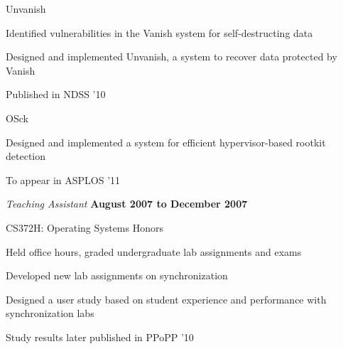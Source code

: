 \documentclass[10pt]{article}
\renewcommand{\section}[2]%
        {\pagebreak[2]\vspace{1.3\baselineskip}%
         \phantomsection\addcontentsline{toc}{section}{#1}%
         \hspace{0in}%
         \marginpar{
         \raggedright \scshape #1}#2}
\newenvironment{outerlist}[1][\enskip\textbullet]%
        {\begin{itemize}[#1]}{\end{itemize}%
         \vspace{-.6\baselineskip}}
\newenvironment{innerlist}[1][\enskip\textbullet]%
        {\begin{compactitem}[#1]}{\end{compactitem}}
\begin{document}
\begin{outerlist}
\begin{innerlist}
        \item Unvanish
        \begin{innerlist}
           \item Identified vulnerabilities in the Vanish system for
self-destructing data
           \item Designed and implemented Unvanish, a system to recover
data protected by Vanish
           \item Published in NDSS '10
         \end{innerlist}
         \item OSck
         \begin{innerlist}
            \item Designed and implemented a system for efficient
hypervisor-based rootkit detection
            \item To appear in ASPLOS '11
         \end{innerlist}
    \end{innerlist}
\item[] \textit{Teaching Assistant}%
        \hfill \textbf{August 2007 to December 2007}
        \begin{innerlist}
           \item CS372H: Operating Systems Honors
           \begin{innerlist}
              \item Held office hours, graded undergraduate lab assignments and exams
              \item Developed new lab assignments on synchronization
              \item Designed a user study based on student experience and
performance with synchronization labs
              \item Study results later published in PPoPP '10
           \end{innerlist}
        \end{innerlist}
\end{outerlist}

\begin{comment}

\section{Technical\\Skills}
C, C++, x86 assembly, Java, Python, PHP

\bigskip

Kernel hacking, parallel programming

\bigskip

Data analysis and graphing with the R
software environment for statistical computing

\section{References}
\end{comment}
\end{document}

